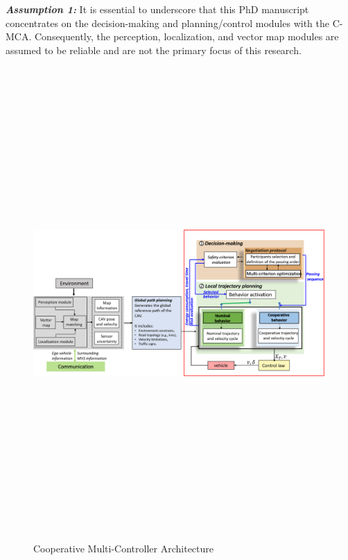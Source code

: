 \textbf{\textit{Assumption 1:}} It is essential to underscore that this PhD manuscript concentrates on the decision-making and planning/control modules with the C-MCA. Consequently, the perception, localization, and vector map modules are assumed to be reliable and are not the primary focus of this research.  





\newpage
\thispagestyle{empty}
\begin{landscape}
        \begin{figure}[!h]
        \centering 
        \includegraphics[width=20cm,height=18cm,keepaspectratio]{chapters/Chapitre_4/Figures/C_MCA.png}
        \vspace{-2.3mm}
        \caption{Cooperative Multi-Controller Architecture }
        \label{fig:C-MCA}
        \vspace{-5mm}
        \end{figure}


\end{landscape}

















